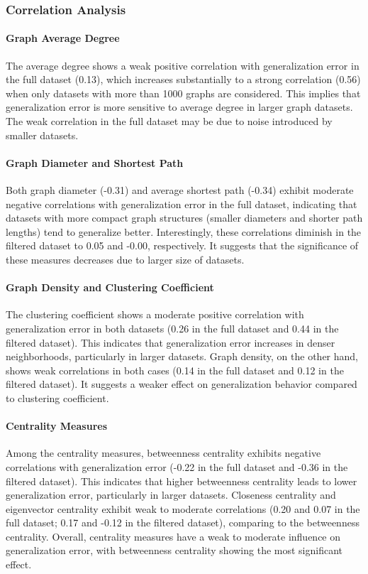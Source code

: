 \subsubsection{Correlation Analysis}

\paragraph{Graph Average Degree}
The average degree shows a weak positive correlation with generalization error in the full dataset (0.13), which increases substantially to a strong correlation (0.56) when only datasets with more than 1000 graphs are considered. This implies that generalization error is more sensitive to average degree in larger graph datasets. The weak correlation in the full dataset may be due to noise introduced by smaller datasets.

\paragraph{Graph Diameter and Shortest Path}
Both graph diameter (-0.31) and average shortest path (-0.34) exhibit moderate negative correlations with generalization error in the full dataset, indicating that datasets with more compact graph structures (smaller diameters and shorter path lengths) tend to generalize better. Interestingly, these correlations diminish in the filtered dataset to 0.05 and -0.00, respectively. It suggests that the significance of these measures decreases due to larger size of datasets. 

\paragraph{Graph Density and Clustering Coefficient}
The clustering coefficient shows a moderate positive correlation with generalization error in both datasets (0.26 in the full dataset and 0.44 in the filtered dataset). This indicates that generalization error increases in denser neighborhoods, particularly in larger datasets. Graph density, on the other hand, shows weak correlations in both cases (0.14 in the full dataset and 0.12 in the filtered dataset). It suggests a weaker effect on generalization behavior compared to clustering coefficient.

\paragraph{Centrality Measures}
Among the centrality measures, betweenness centrality exhibits negative correlations with generalization error (-0.22 in the full dataset and -0.36 in the filtered dataset). This indicates that higher betweenness centrality leads to lower generalization error, particularly in larger datasets. Closeness centrality and eigenvector centrality exhibit weak to moderate correlations (0.20 and 0.07 in the full dataset; 0.17 and -0.12 in the filtered dataset), comparing to the betweenness centrality. Overall, centrality measures have a weak to moderate influence on generalization error, with betweenness centrality showing the most significant effect.

